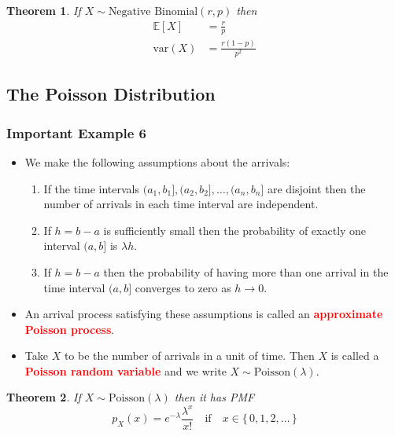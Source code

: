 \documentclass{article}
\newcommand{\E}{\mathbb{E}}
\newcommand{\var}{\text{var}}
\newcommand{\bfred}[1]{\textcolor{red}{\textbf{#1}}}
\theoremstyle{plain}
\newtheorem{thm}{Theorem}[section]
\theoremstyle{definition}
\theoremstyle{remark}
\begin{document}
\begin{thm}
    If $X \sim \text{Negative Binomial}(r,p)$ then
    \begin{align*}
        \E[X] &= \frac{r}{p} \\
        \var(X) &= \frac{r(1-p)}{p^2}
    \end{align*}
\end{thm}

\subsection{The Poisson Distribution}

\subsubsection*{Important Example 6}

\begin{tcolorbox}[title = Poisson Random Variable, colback = SkyBlue!5!white,colframe = SkyBlue!75!black]
    \begin{itemize}
        \item We make the following assumptions about the arrivals:
        \begin{enumerate}[(1)]
            \item If the time intervals $(a_1,b_1],(a_2,b_2],\dotsc,(a_n,b_n]$ are disjoint then the number of arrivals in each time interval are independent.
            \item If $h=b-a$ is sufficiently small then the probability of exactly one interval $(a,b]$ is $\lambda h$.
            \item If $h=b-a$ then the probability of having more than one arrival in the time interval $(a,b]$ converges to zero as $h \rightarrow 0$.
        \end{enumerate}
        \item An arrival process satisfying these assumptions is called an \bfred{approximate Poisson process}.
        \item Take $X$ to be the number of arrivals in a unit of time. Then $X$ is called a \bfred{Poisson random variable} and we write $X \sim \text{Poisson}(\lambda)$.
    \end{itemize}
\end{tcolorbox}

\begin{thm}
    If $X \sim \text{Poisson}(\lambda)$ then it has PMF \[p_X(x) = e^{-\lambda}\frac{\lambda^x}{x!} \quad \text{if} \quad x \in \{\,0,1,2,\dotsc\,\}\]
\end{thm}
\end{document}
